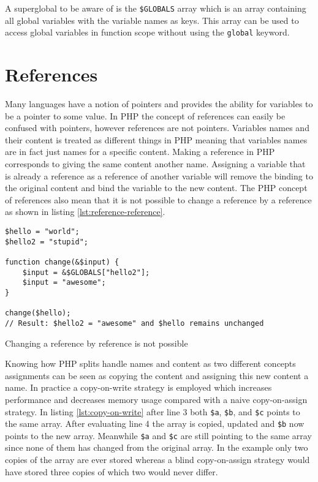 A superglobal to be aware of is the \texttt{\$GLOBALS} array which is an array containing all global variables with the variable names as keys. This array can be used to access global variables in function scope without using the \texttt{global} keyword.


\section{References}
\label{sec:backg_references}
Many languages have a notion of pointers and provides the ability for variables to be a pointer to some value. In PHP the concept of references can easily be confused with pointers, however references are not pointers. Variables names and their content is treated as different things in PHP meaning that variables names are in fact just names for a specific content. Making a reference in PHP corresponds to giving the same content another name. Assigning a variable that is already a reference as a reference of another variable will remove the binding to the original content and bind the variable to the new content. The PHP concept of references also mean that it is not possible to change a reference by a reference as shown in listing \ref{lst:reference-reference}.

\begin{program}
\begin{lstlisting}
$hello = "world";
$hello2 = "stupid";

function change(&$input) {
    $input = &$GLOBALS["hello2"];
    $input = "awesome";
}

change($hello);
// Result: $hello2 = "awesome" and $hello remains unchanged
\end{lstlisting}
\caption{Changing a reference by reference is not possible}
\label{lst:reference-reference}
\end{program}

Knowing how PHP splits handle names and content as two different concepts assignments can be seen as copying the content and assigning this new content a name. In practice a copy-on-write strategy is employed which increases performance and decreases memory usage compared with a naive copy-on-assign strategy. In listing \ref{lst:copy-on-write} after line 3 both \texttt{\$a}, \texttt{\$b}, and \texttt{\$c} points to the same array. After evaluating line 4 the array is copied, updated and \texttt{\$b} now points to the new array. Meanwhile \texttt{\$a} and \texttt{\$c} are still pointing to the same array since none of them has changed from the original array. In the example only two copies of the array are ever stored whereas a blind copy-on-assign strategy would have stored three copies of which two would never differ.


